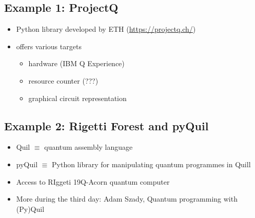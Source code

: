 \documentclass{beamer}
\begin{document}
\subsection{Example 1: ProjectQ}

\begin{frame}{\insertsection}{\insertsubsection}
	\begin{itemize}
        \item Python library developed by ETH (\url{https://projectq.ch/})
        \item offers various targets
        \begin{itemize}
            \item hardware (IBM Q Experience)
            \item resource counter (???)
            \item graphical circuit representation
        \end{itemize}
    \end{itemize}
\end{frame}

\begin{frame}{\insertsection}{\insertsubsection}
	
\end{frame}

\begin{frame}{\insertsection}{\insertsubsection}
	
\end{frame}

\begin{frame}{\insertsection}{\insertsubsection}
	
\end{frame}


\subsection{Example 2: Rigetti Forest and pyQuil}

\begin{frame}{\insertsection}{\insertsubsection}
	\begin{itemize}
        \item<1-> Quil $\equiv$ quantum assembly language
        \item<2-> pyQuil $\equiv$ Python library for manipulating quantum 
        programmes in Quill
        \item<3-> Access to RIggeti 19Q-Acorn quantum computer
        \item<4-> More during the third day: Adam Szady, Quantum programming 
        with (Py)Quil
    \end{itemize}
\end{frame}
\end{document}
